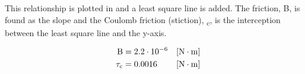 This relationship is plotted in  and a least square line is added. The friction, B, is found as the slope and the Coulomb friction (stiction), \si{\tau_c}, is the interception between the least square line and the y-axis.

\begin{align}
  \eq{B}{\num{2.2}\cdot 10^{-6}} \unit{N\cdot m}\nonumber\\
  \eq{\tau_c}{\num{0.0016}} \unit{N\cdot m}\nonumber
\end{align}